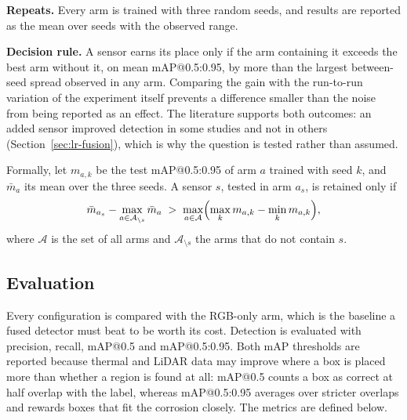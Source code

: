\textbf{Repeats.} Every arm is trained with three random seeds, and results are
reported as the mean over seeds with the observed range.

\textbf{Decision rule.} A sensor earns its place only if the arm containing it
exceeds the best arm without it, on mean mAP@0.5:0.95, by more than the largest
between-seed spread observed in any arm. Comparing the gain with the run-to-run
variation of the experiment itself prevents a difference smaller than the noise
from being reported as an effect. The literature supports both outcomes: an
added sensor improved detection in some studies and not in others
(Section~\ref{sec:lr-fusion}), which is why the question is tested rather than
assumed.

Formally, let $m_{a,k}$ be the test mAP@0.5:0.95 of arm $a$ trained with seed
$k$, and $\bar{m}_a$ its mean over the three seeds. A sensor $s$, tested in
arm $a_s$, is retained only if
\begin{equation}
\bar{m}_{a_s} - \max_{a \in \mathcal{A}_{\setminus s}} \bar{m}_a \;>\;
\max_{a \in \mathcal{A}} \Bigl( \max_k m_{a,k} - \min_k m_{a,k} \Bigr),
\label{eq:decision}
\end{equation}
where $\mathcal{A}$ is the set of all arms and $\mathcal{A}_{\setminus s}$ the
arms that do not contain $s$.

\subsection{Evaluation}
\label{sec:evaluation}

Every configuration is compared with the RGB-only arm, which is the baseline a
fused detector must beat to be worth its cost. Detection is evaluated with
precision, recall, mAP@0.5 and mAP@0.5:0.95. Both mAP thresholds are reported
because thermal and LiDAR data may improve where a box is placed more than
whether a region is found at all: mAP@0.5 counts a box as correct at half
overlap with the label, whereas mAP@0.5:0.95 averages over stricter overlaps and
rewards boxes that fit the corrosion closely.
The metrics are defined below.

